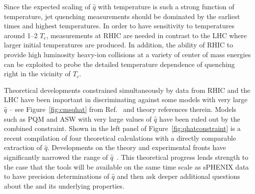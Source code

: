 
Since the expected scaling of $\hat{q}$ with temperature is such a
strong function of temperature, jet quenching measurements should be
dominated by the earliest times and highest temperatures.  In order
to have sensitivity to temperatures around 1--2 $T_c$, measurements
at RHIC are needed in contrast to the LHC where larger initial
temperatures are produced.  In addition, the ability of RHIC to
provide high luminosity heavy-ion collisions at a variety of center
of mass energies can be exploited to probe the detailed temperature
dependence of quenching right in the vicinity of $T_c$.

Theoretical developments constrained simultaneously by data from RHIC and the LHC 
have been important in discriminating against some models with very
large $\hat{q}$  -- see Figure~\ref{fig:cmsqhat} from Ref.~\cite{CMS:2012aa} and theory
references therein.  Models such as PQM and ASW with very large values of $\hat{q}$ have been ruled out
by the combined constraint.  Shown in the left panel of Figure~\ref{fig:qhatconstraint} is a recent compilation of four
theoretical calculations with a directly comparable extraction of $\hat{q}$.  Developments on the 
theory and experimental fronts have significantly narrowed the 
range of $\hat{q}$~\cite{JETCollaboration:QhatConstraint}.
This theoretical progress lends strength to the case that the tools will be
available on the same time scale as sPHENIX data to have precision determinations
of $\hat{q}$ and then ask deeper additional questions about the \qgp and its underlying properties.

